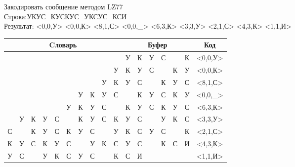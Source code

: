 \documentclass[a4paper, 12pt]{article}
\begin{document}
Закодировать сообщение методом LZ77\\
Строка:УКУС\_КУСКУС\_УКСУС\_КСИ\\
Результат: <0,0,У> <0,0,К> <8,1,С> <0,0,\_> <6,3,К> <3,3,У> <2,1,С> <4,3,К> <1,1,И>\\
\begin{table}[h!]
\centering
\begin{tabular}{|c|c|c|c|c|c|c|c|c|c|c|c|c|c|c|c|c|} 
\hline
\multicolumn{10}{|c|}{Cловарь} & \multicolumn{6}{c|}{Буфер} & Код  \\ \hline
  &   &   &   &   &   &   &   &   &   & \cellcolor[HTML]{8CE4F6} У & К & У & С &   & К & <0,0,У>
\\ \hline
  &   &   &   &   &   &   &   &   & У & \cellcolor[HTML]{8CE4F6} К & У & С &   & К & У & <0,0,К>
\\ \hline
  &   &   &   &   &   &   &   & \cellcolor[HTML]{FFFF00} У & К & \cellcolor[HTML]{FFFF00} У & \cellcolor[HTML]{8CE4F6} С &   & К & У & С & <8,1,С>
\\ \hline
  &   &   &   &   &   & У & К & У & С & \cellcolor[HTML]{8CE4F6}   & К & У & С & К & У & <0,0,\_>
\\ \hline
  &   &   &   &   & У & \cellcolor[HTML]{FFFF00} К & \cellcolor[HTML]{FFFF00} У & \cellcolor[HTML]{FFFF00} С &   & \cellcolor[HTML]{FFFF00} К & \cellcolor[HTML]{FFFF00} У & \cellcolor[HTML]{FFFF00} С & \cellcolor[HTML]{8CE4F6} К & У & С & <6,3,К>
\\ \hline
  & У & К & \cellcolor[HTML]{FFFF00} У & \cellcolor[HTML]{FFFF00} С & \cellcolor[HTML]{FFFF00}   & К & У & С & К & \cellcolor[HTML]{FFFF00} У & \cellcolor[HTML]{FFFF00} С & \cellcolor[HTML]{FFFF00}   & \cellcolor[HTML]{8CE4F6} У & К & С & <3,3,У>
\\ \hline
С &   & \cellcolor[HTML]{FFFF00} К & У & С & К & У & С &   & У & \cellcolor[HTML]{FFFF00} К & \cellcolor[HTML]{8CE4F6} С & У & С &   & К & <2,1,С>
\\ \hline
К & У & С & К & \cellcolor[HTML]{FFFF00} У & \cellcolor[HTML]{FFFF00} С & \cellcolor[HTML]{FFFF00}   & У & К & С & \cellcolor[HTML]{FFFF00} У & \cellcolor[HTML]{FFFF00} С & \cellcolor[HTML]{FFFF00}   & \cellcolor[HTML]{8CE4F6} К & С & И & <4,3,К>
\\ \hline
У & \cellcolor[HTML]{FFFF00} С &   & У & К & С & У & С &   & К & \cellcolor[HTML]{FFFF00} С & \cellcolor[HTML]{8CE4F6} И &   &   &   &   & <1,1,И>
\\ \hline
\end{tabular}
\end{table}
\end{document}
